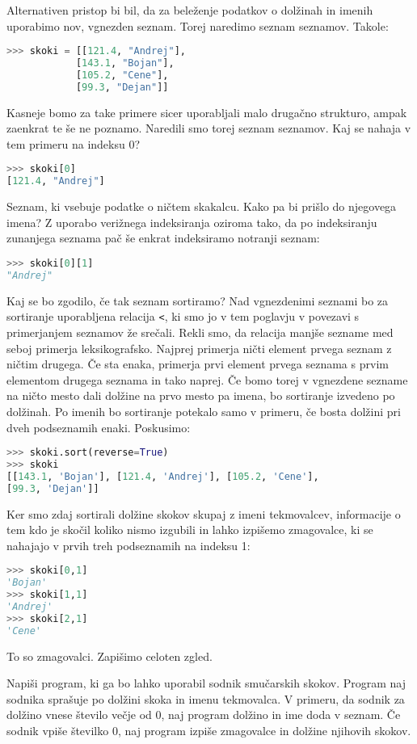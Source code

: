 Alternativen pristop bi bil, da za beleženje podatkov o dolžinah in imenih uporabimo nov, vgnezden seznam. Torej naredimo seznam seznamov. Takole:
\begin{lstlisting}[language=Python]
>>> skoki = [[121.4, "Andrej"], 
            [143.1, "Bojan"], 
            [105.2, "Cene"], 
            [99.3, "Dejan"]]
\end{lstlisting}
Kasneje bomo za take primere sicer uporabljali malo drugačno strukturo, ampak zaenkrat te še ne poznamo. Naredili smo torej seznam seznamov. Kaj se nahaja v tem primeru na indeksu 0?
\begin{lstlisting}[language=Python]
>>> skoki[0]
[121.4, "Andrej"]
\end{lstlisting}
Seznam, ki vsebuje podatke o ničtem skakalcu. Kako pa bi prišlo do njegovega imena? Z uporabo verižnega indeksiranja oziroma tako, da po indeksiranju zunanjega seznama pač še enkrat indeksiramo notranji seznam:
\begin{lstlisting}[language=Python]
>>> skoki[0][1]
"Andrej"
\end{lstlisting}
Kaj se bo zgodilo, če tak seznam sortiramo? Nad vgnezdenimi seznami bo za sortiranje uporabljena relacija \texttt{<}, ki smo jo v tem poglavju v povezavi s primerjanjem seznamov že srečali. Rekli smo, da relacija manjše sezname med seboj primerja leksikografsko. Najprej primerja ničti element prvega seznam z ničtim drugega. Če sta enaka, primerja prvi element prvega seznama s prvim elementom drugega seznama in tako naprej. Če bomo torej v vgnezdene sezname na ničto mesto dali dolžine na prvo mesto pa imena, bo sortiranje izvedeno po dolžinah. Po imenih bo sortiranje potekalo samo v primeru, če bosta dolžini pri dveh podseznamih enaki. Poskusimo:
\begin{lstlisting}[language=Python]
>>> skoki.sort(reverse=True)
>>> skoki
[[143.1, 'Bojan'], [121.4, 'Andrej'], [105.2, 'Cene'],
[99.3, 'Dejan']]
\end{lstlisting}
Ker smo zdaj sortirali dolžine skokov skupaj z imeni tekmovalcev, informacije o tem kdo je skočil koliko nismo izgubili in lahko izpišemo zmagovalce, ki se nahajajo v prvih treh podseznamih na indeksu 1:
\begin{lstlisting}[language=Python]
>>> skoki[0,1]
'Bojan'
>>> skoki[1,1]
'Andrej'
>>> skoki[2,1]
'Cene'
\end{lstlisting}
To so zmagovalci. Zapišimo celoten zgled.
\begin{zgled}
Napiši program, ki ga bo lahko uporabil sodnik smučarskih skokov. Program naj sodnika sprašuje po dolžini skoka in imenu tekmovalca. V primeru, da sodnik za dolžino vnese število večje od 0, naj program dolžino in ime doda v seznam. Če sodnik vpiše številko 0, naj program izpiše zmagovalce in dolžine njihovih skokov.
\end{zgled}
